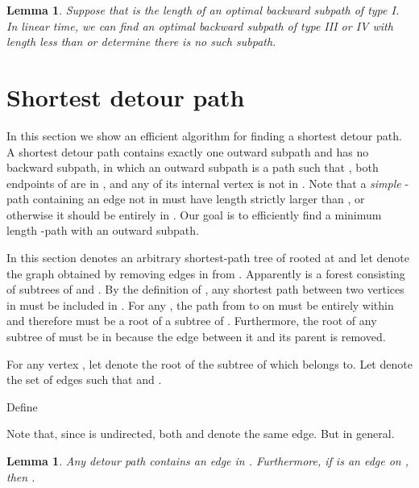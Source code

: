 \documentclass[review]{elsarticle}
\def\squarebox#1{\hbox to #1{\hfill\vbox to #1{\vfill}}}
\renewcommand{\qed}{\hspace*{\fill}
            \vbox{\hrule\hbox{\vrule\squarebox{.667em}\vrule}\hrule}\smallskip\newline}
\newtheorem{lem}[thm]{Lemma}
\begin{document}
\begin{lem}\label{type34t}
Suppose that  is the length of an optimal backward subpath of
type I. In linear time, we can find an optimal backward subpath of
type III or IV with length less than  or determine there is no
such subpath.
\end{lem}

\section{Shortest detour path}

In this section we show an efficient algorithm for finding a
shortest detour path. A shortest detour path contains exactly one
outward subpath and has no backward subpath, in which an outward
subpath is a path  such that , both endpoints
of  are in , and any of its internal vertex is not in
. Note that a \emph{simple} -path containing an edge not
in  must have length strictly larger than , or otherwise
it should be entirely in . Our goal is to efficiently find a
minimum length -path with an outward subpath.

In this section  denotes an arbitrary shortest-path tree of 
rooted at  and let  denote the graph obtained by
removing edges in  from . Apparently  is a
forest consisting of subtrees of  and . By the
definition of , any shortest path between two vertices in 
must be included in . For any , the path from 
to  on  must be entirely within  and therefore  must
be a root of a subtree of . Furthermore, the root of any subtree
of  must be in  because the edge between it and its parent
is removed.
\begin{defi}
For any vertex , let  denote the root of the subtree of
 which  belongs to. Let  denote the set of
edges  such that  and .
\end{defi}


Define

Note that, since  is undirected, both  and  denote
the same edge. But  in general.

\begin{lem}\label{out1}
Any detour path  contains an edge in .
Furthermore, if  is an edge on , then
.
\end{lem}
\end{document}

